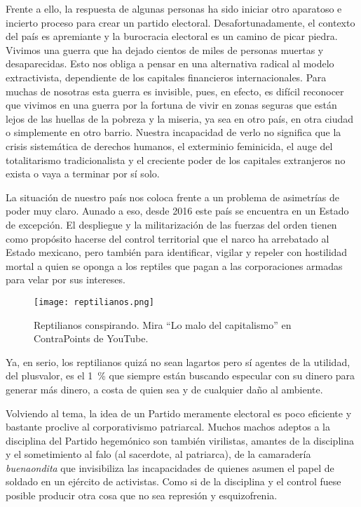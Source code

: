 Frente a ello, la respuesta de algunas personas ha sido iniciar otro aparatoso e incierto proceso para crear un partido electoral. Desafortunadamente, el contexto del país es apremiante y la burocracia electoral es un camino de picar piedra. Vivimos una guerra que ha dejado cientos de miles de personas muertas y desaparecidas. Esto nos obliga a pensar en una alternativa radical al modelo extractivista, dependiente de los capitales financieros internacionales. Para muchas de nosotras esta guerra es invisible, pues, en efecto, es difícil reconocer que vivimos en una guerra por la fortuna de vivir en zonas seguras que están lejos de las huellas de la pobreza y la miseria, ya sea en otro país, en otra ciudad o simplemente en otro barrio. Nuestra incapacidad de verlo no significa que la crisis sistemática de derechos humanos, el exterminio feminicida, el auge del totalitarismo tradicionalista y el creciente poder de los capitales extranjeros no exista o vaya a terminar por sí solo.

La situación de nuestro país nos coloca frente a un problema de asimetrías de poder muy claro. Aunado a eso, desde 2016 este país se encuentra en un Estado de excepción. El despliegue y la militarización de las fuerzas del orden tienen como propósito hacerse del control territorial que el narco ha arrebatado al Estado mexicano, pero también para identificar, vigilar y repeler con hostilidad mortal a quien se oponga a los reptiles que pagan a las corporaciones armadas para velar por sus intereses.


\begin{figure}[htbp]
	\centering
	\texttt{[image: reptilianos.png]}
	\caption[Reptilianos conspirando.]{Reptilianos conspirando. Mira \enquote{Lo malo del capitalismo} en ContraPoints de YouTube.}
	\label{fig:reptilianos}
\end{figure}

Ya, en serio, los reptilianos quizá no sean lagartos pero sí agentes de la utilidad, del plusvalor, es el 1~\% que siempre están buscando especular con su dinero para generar más dinero, a costa de quien sea y de cualquier daño al ambiente.

Volviendo al tema, la idea de un Partido meramente electoral es poco eficiente y bastante proclive al corporativismo patriarcal. Muchos machos adeptos a la disciplina del Partido hegemónico son también virilistas, amantes de la disciplina y el sometimiento al falo (al sacerdote, al patriarca), de la camaradería \emph{buenaondita} que invisibiliza las incapacidades de quienes asumen el papel de soldado  en un ejército de activistas. Como si de la disciplina y el control fuese posible producir otra cosa que no sea represión y esquizofrenia.

